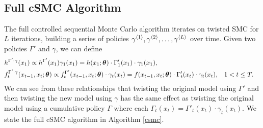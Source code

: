\documentclass[twoside]{article}
\begin{document}
\begin{algorithm}[H]
\begin{algorithmic}[1]
    \EndFor
   	 \EndFor
    \EndFor
    \EndFor \\
   \end{algorithmic}
\end{algorithm}

\subsection{Full cSMC Algorithm}
The full controlled sequential Monte Carlo algorithm iterates on twisted SMC for $L$ iterations, building a series of policies $\gamma^{\langle1\rangle}_{}, \gamma^{\langle2\rangle}_{}, \ldots, \gamma^{\langle L\rangle}_{}$  over time.    
Given two policies $\Gamma'$ and $\gamma$, we can define
\begin{align*}
&h^{\Gamma' \cdot \gamma}(x_1) \propto h^{\Gamma'}(x_1) \gamma_1(x_1) = h(x_1; \boldsymbol{\theta}) \cdot {\Gamma'_1}(x_1) \cdot \gamma_1(x_1), & \\ 
& f^{\Gamma' \cdot \gamma}_t(x_{t-1}, x_{t}; \boldsymbol{\theta}) \propto f^{\Gamma'}_t(x_{t-1}, x_t; \boldsymbol{\theta}) \cdot \gamma_t(x_t) = f(x_{t-1}, x_t; \boldsymbol{\theta}) \cdot \Gamma'_t(x_t) \cdot \gamma_t(x_t), & & 1 < t \leq T.
\end{align*}
We can see from these relationships that twisting the original model using $\Gamma'$ and then twisting the new model using $\gamma$ has the same effect as twisting the original model using a cumulative policy $\Gamma$ where each $\Gamma_t(x_t) = \Gamma'_t(x_t) \cdot \gamma_t(x_t)$.  We state the full cSMC algorithm in Algorithm \ref{csmc}.
\end{document}
